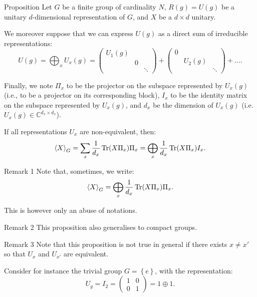 \documentclass[a4paper]{article}
\begin{document}
\begin{parag}{Proposition}
    Let $G$ be a finite group of cardinality $N$, $R\left(g\right) = U\left(g\right)$ be a unitary $d$-dimensional representation of $G$, and $X$ be a $d \times d$ unitary.

    We moreover suppose that we can express $U\left(g\right)$ as a direct sum of irreducible representations:
    \[U\left(g\right) = \bigoplus_{x} U_x\left(g\right) = \begin{pmatrix} U_1\left(g\right) &  &  \\  & 0 &  \\  &  & \ddots \end{pmatrix} + \begin{pmatrix} 0 &  &  \\  & U_2\left(g\right) &  \\  &  & \ddots \end{pmatrix} + \ldots.\]

    Finally, we note $\Pi_x$ to be the projector on the subspace represented by $U_x\left(g\right)$ (i.e., to be a projector on its corresponding block), $I_x$ to be the identity matrix on the subspace represented by $U_x\left(g\right)$, and $d_x$ be the dimension of $U_x\left(g\right)$ (i.e. $U_x\left(g\right) \in \mathbb{C}^{d_x \times d_x}$).

    If all representations $U_x$ are non-equivalent, then: 
    \[\left\langle X \right\rangle_G = \sum_x \frac{1}{d_x} \Tr\left(X \Pi_x\right) \Pi_x = \bigoplus_x \frac{1}{d_x} \Tr\left(X \Pi_x\right) I_x.\]

    \begin{subparag}{Remark 1}
        Note that, sometimes, we write:
        \[\left\langle X \right\rangle_G = \bigoplus_x \frac{1}{d_x} \Tr\left(X \Pi_x\right) \Pi_x.\]

        This is however only an abuse of notations.
    \end{subparag}
    
    \begin{subparag}{Remark 2}
        This proposition also generalises to compact groups.
    \end{subparag}

    \begin{subparag}{Remark 3}
        Note that this proposition is not true in general if there exists $x \neq x'$ so that $U_x$ and $U_{x'}$ are equivalent. 

        Consider for instance the trivial group $G = \left\{e\right\}$, with the representation: 
        \[U_g = I_2 = \begin{pmatrix} 1 & 0 \\ 0 & 1 \end{pmatrix} = 1 \oplus 1.\]


\end{subparag}
\end{parag}
\end{document}
